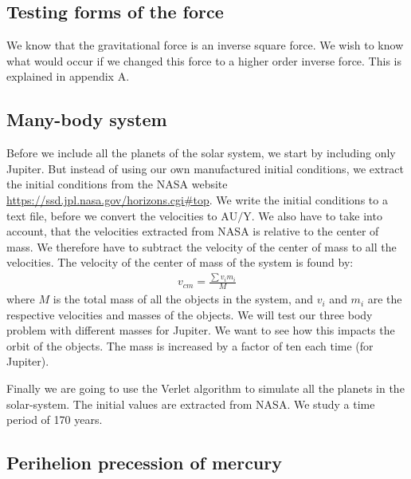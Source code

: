 \documentclass{article}
\begin{document}
\begin{multicols}{2}
\subsection{Testing forms of the force}

We know that the gravitational force is an inverse square force. We wish to know what would occur if we changed this force to a higher order inverse force. This is explained in appendix A.

\subsection{Many-body system}

Before we include all the planets of the solar system, we start by including only Jupiter. But instead of using our own manufactured initial conditions, we extract the initial conditions from the NASA website \url{https://ssd.jpl.nasa.gov/horizons.cgi#top}. We write the initial conditions to a text file, before we convert the velocities to $\text{AU/Y}$. We also have to take into account, that the velocities extracted from NASA is relative to the center of mass. We therefore have to subtract the velocity of the center of mass to all the velocities. The velocity of the center of mass of the system is found by:
\begin{align}
v_{cm} = \frac{\sum v_i m_i}{M}
\end{align}
where $M$ is the total mass of all the objects in the system, and $v_i$ and $m_i$ are the respective velocities and masses of the objects. We will test our three body problem with different masses for Jupiter. We want to see how this impacts the orbit of the objects. The mass is increased by a factor of ten each time (for Jupiter). 

Finally we are going to use the Verlet algorithm to simulate all the planets in the solar-system. The initial values are extracted from NASA. We study a time period of 170 years. 

\subsection{Perihelion precession of mercury}


\end{multicols}
\end{document}
